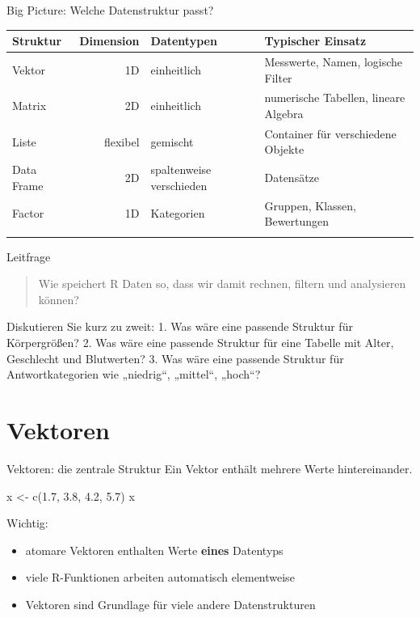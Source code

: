 \documentclass[
  10pt,
  ignorenonframetext,
  aspectratio=169,
]{beamer}
\newenvironment{Shaded}{}{}
\newcommand{\FloatTok}[1]{\textcolor[rgb]{0.25,0.63,0.44}{#1}}
\newcommand{\FunctionTok}[1]{\textcolor[rgb]{0.02,0.16,0.49}{#1}}
\newcommand{\NormalTok}[1]{#1}
\newcommand{\OtherTok}[1]{\textcolor[rgb]{0.00,0.44,0.13}{#1}}
\providecommand{\tightlist}{%
  \setlength{\itemsep}{0pt}\setlength{\parskip}{0pt}}
\begin{document}
\begin{frame}{Big Picture: Welche Datenstruktur passt?}
\label{big-picture-welche-datenstruktur-passt}
\begin{longtable}[]{@{}lrll@{}}
\toprule\noalign{}
Struktur & Dimension & Datentypen & Typischer Einsatz \\
\midrule\noalign{}
\endhead
Vektor & 1D & einheitlich & Messwerte, Namen, logische Filter \\
Matrix & 2D & einheitlich & numerische Tabellen, lineare Algebra \\
Liste & flexibel & gemischt & Container für verschiedene Objekte \\
Data Frame & 2D & spaltenweise verschieden & Datensätze \\
Factor & 1D & Kategorien & Gruppen, Klassen, Bewertungen \\
\bottomrule\noalign{}
\end{longtable}
\end{frame}

\begin{frame}{Leitfrage}
\label{leitfrage}
\begin{quote}
Wie speichert R Daten so, dass wir damit rechnen, filtern und
analysieren können?
\end{quote}

Diskutieren Sie kurz zu zweit: 1. Was wäre eine passende Struktur für
Körpergrößen? 2. Was wäre eine passende Struktur für eine Tabelle mit
Alter, Geschlecht und Blutwerten? 3. Was wäre eine passende Struktur für
Antwortkategorien wie „niedrig``, „mittel``, „hoch``?
\end{frame}

\section{Vektoren}\label{vektoren}

\begin{frame}[fragile]{Vektoren: die zentrale Struktur}
\label{vektoren-die-zentrale-struktur}
Ein Vektor enthält mehrere Werte hintereinander.

\begin{Shaded}
\begin{Highlighting}[]
\NormalTok{x }\OtherTok{\textless{}{-}} \FunctionTok{c}\NormalTok{(}\FloatTok{1.7}\NormalTok{, }\FloatTok{3.8}\NormalTok{, }\FloatTok{4.2}\NormalTok{, }\FloatTok{5.7}\NormalTok{)}
\NormalTok{x}
\end{Highlighting}
\end{Shaded}

Wichtig:

\begin{itemize}
\tightlist
\item
  atomare Vektoren enthalten Werte \textbf{eines} Datentyps
\item
  viele R-Funktionen arbeiten automatisch elementweise
\item
  Vektoren sind Grundlage für viele andere Datenstrukturen
\end{itemize}
\end{frame}
\end{document}
